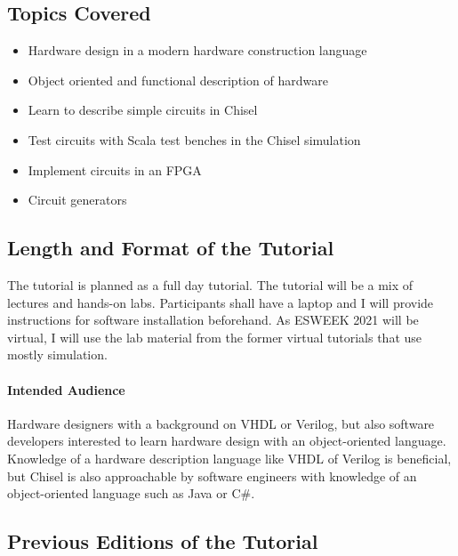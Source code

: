\documentclass{article}
\begin{document}
\subsection*{Topics Covered}

\begin{itemize}
\item Hardware design in a modern hardware construction language
\item Object oriented and functional description of hardware
\item Learn to describe simple circuits in Chisel
\item Test circuits with Scala test benches in the Chisel simulation
\item Implement circuits in an FPGA
\item Circuit generators
\end{itemize}

\subsection*{Length and Format of the Tutorial}

The tutorial is planned as a full day tutorial.
The tutorial will be a mix of lectures and hands-on labs. Participants shall have a laptop and I will provide
instructions for software installation beforehand.
As ESWEEK 2021 will be virtual, I will use the lab material from the former virtual tutorials that use mostly simulation.



\paragraph{Intended Audience}

Hardware designers with a background on VHDL or Verilog, but also software developers
interested to learn hardware design with an object-oriented language.
Knowledge of a hardware description language like VHDL of Verilog is beneficial, but Chisel is also
approachable by software engineers with knowledge of an object-oriented language such as Java or C\#.
 

\subsection*{Previous Editions of the Tutorial}
\end{document}
